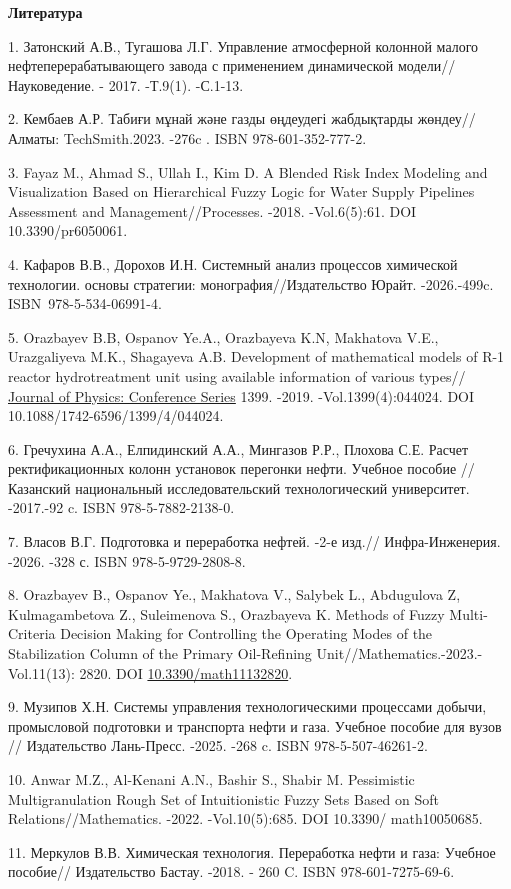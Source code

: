 \begin{center}
{\bfseries Литература}
\end{center}

\begin{refs}
1. Затонский А.В., Тугашова Л.Г. Управление атмосферной колонной малого
нефтеперерабатывающего завода с применением динамической
модели//Науковедение. - 2017. -Т.9(1). -С.1-13.

2. Кембаев А.Р. Табиғи мұнай және газды өңдеудегі жабдықтарды жөндеу//
Алматы: TechSmith.2023. -276c . ISBN 978-601-352-777-2.

3. Fayaz M., Ahmad S., Ullah I., Kim D. A Blended Risk Index Modeling
and Visualization Based on Hierarchical Fuzzy Logic for Water Supply
Pipelines Assessment and Management//Processes. -2018. -Vol.6(5):61. DOI
10.3390/pr6050061.

4. Кафаров В.В., Дорохов И.Н. Системный анализ процессов химической
технологии. основы стратегии: монография//Издательство Юрайт.
-2026.-499c. ISBN~978-5-534-06991-4.

5. Orazbayev B.B, Ospanov Ye.A., Orazbayeva K.N, Makhatova V.E.,
Urazgaliyeva M.K., Shagayeva A.B. Development of mathematical models of
R-1 reactor hydrotreatment unit using available information of various
types// \href{https://iopscience.iop.org/journal/1742-6596}{Journal of
Physics: Conference Series} 1399. -2019. -Vol.1399(4):044024. DOI
10.1088/1742-6596/1399/4/044024.

6. Гречухина А.А., Елпидинский А.А., Мингазов Р.Р., Плохова С.Е. Расчет
ректификационных колонн установок перегонки нефти. Учебное пособие
//Казанский национальный исследовательский технологический университет.
-2017.-92 c. ISBN 978-5-7882-2138-0.

7. Власов В.Г. Подготовка и переработка нефтей. -2-е изд.//
Инфра-Инженерия. -2026. -328 с. ISBN 978-5-9729-2808-8.

8. Orazbayev B., Ospanov Ye., Makhatova V., Salybek L., Abdugulova Z,
Kulmagambetova Z., Suleimenova S., Orazbayeva K. Methods of Fuzzy
Multi-Criteria Decision Making for Controlling the Operating Modes of
the Stabilization Column of the Primary Oil-Refining
Unit//Mathematics.-2023.-Vol.11(13): 2820. DOI
\href{https://doi.org/10.3390/math11132820}{10.3390/math11132820}.

9. Музипов Х.Н. Системы управления технологическими процессами добычи,
промысловой подготовки и транспорта нефти и газа. Учебное пособие для
вузов // Издательство Лань-Пресс. -2025. -268 c. ISBN 978-5-507-46261-2.

10. Anwar M.Z., Al-Kenani A.N., Bashir S., Shabir M. Pessimistic
Multigranulation Rough Set of Intuitionistic Fuzzy Sets Based on Soft
Relations//Mathematics. -2022. -Vol.10(5):685. DOI 10.3390/
math10050685.

11. Меркулов В.В. Химическая технология. Переработка нефти и газа:
Учебное пособие// Издательство Бастау. -2018. - 260 C. ISBN
978-601-7275-69-6.
\end{refs}

